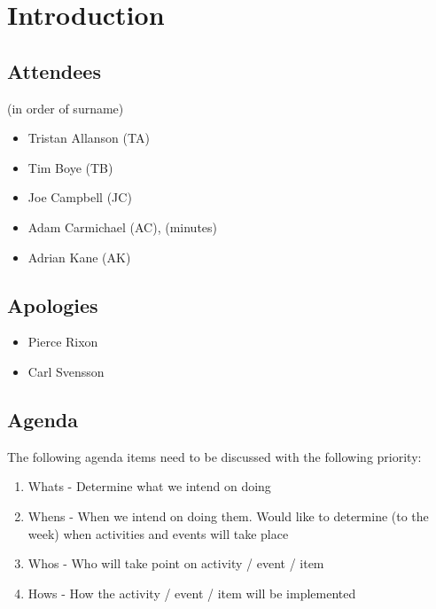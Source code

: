 \section{Introduction}
\label{sec:Introduction}
\subsection{Attendees}
(in order of surname)
\begin{itemize}
  \item Tristan Allanson (TA)
  \item Tim Boye (TB)
  \item Joe Campbell (JC)
  \item Adam Carmichael (AC), (minutes)
  \item Adrian Kane (AK)
\end{itemize}

\subsection{Apologies}
\begin{itemize}
  \item Pierce Rixon
  \item Carl Svensson
\end{itemize}

\subsection{Agenda}
The following agenda items need to be discussed with the following priority: 
\begin{enumerate}
  \item Whats - Determine what we intend on doing
  \item Whens - When we intend on doing them. Would like to determine (to the
  week) when activities and events will take place
  \item Whos - Who will take point on activity / event / item 
  \item Hows - How the activity / event / item will be implemented
\end{enumerate}